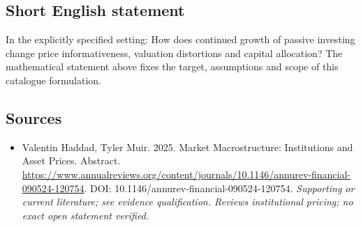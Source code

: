 \documentclass[11pt]{article}
\begin{document}
\subsection{Short English statement}
In the explicitly specified setting: How does continued growth of passive investing change price informativeness, valuation distortions and capital allocation? The mathematical statement above fixes the target, assumptions and scope of this catalogue formulation.

\subsection{Sources}
\begin{itemize}\raggedright
\item[\textnormal{[S1]}]\hypertarget{source:30007597:1}{} Valentin Haddad, Tyler Muir. 2025. Market Macrostructure: Institutions and Asset Prices. Abstract.
\url{https://www.annualreviews.org/content/journals/10.1146/annurev-financial-090524-120754}.
DOI: 10.1146/annurev-financial-090524-120754.
{\small\textit{Supporting or current literature; see evidence qualification. Reviews institutional pricing; no exact open statement verified.}}
\end{itemize}
\end{document}
